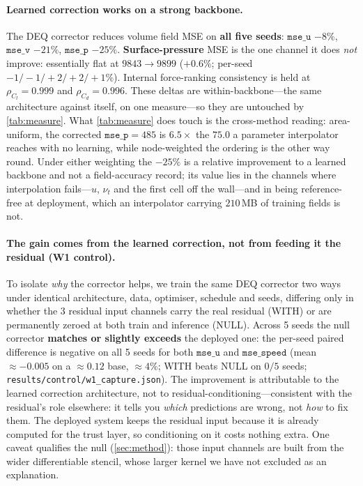 \paragraph{Learned correction works on a strong backbone.} The DEQ corrector reduces
volume field MSE on \textbf{all five seeds}: $\texttt{mse\_u}$ $-8\%$, $\texttt{mse\_v}$
$-21\%$, $\texttt{mse\_p}$ $-25\%$. \textbf{Surface-pressure} MSE is the one channel it
does \emph{not} improve: essentially flat at $9843\rightarrow9899$ ($+0.6\%$; per-seed
$-1/-1/+2/+2/+1\%$). Internal force-ranking consistency is held at $\rho_{C_l}=0.999$ and
$\rho_{C_d}=0.996$. These deltas are within-backbone---the same architecture against
itself, on one measure---so they are untouched by \autoref{tab:measure}. What
\autoref{tab:measure} does touch is the cross-method reading: area-uniform, the corrected
$\texttt{mse\_p}=485$ is $6.5\times$ the $75.0$ a parameter interpolator reaches with no
learning, while node-weighted the ordering is the other way round. Under either weighting
the $-25\%$ is a relative improvement to a learned backbone and not a field-accuracy
record; its value lies in the channels where interpolation fails---$u$, $\nu_t$ and the
first cell off the wall---and in being reference-free at deployment, which an interpolator
carrying $210$\,MB of training fields is not.

\paragraph{The gain comes from the learned correction, not from feeding it the residual
(W1 control).} To isolate \emph{why} the corrector helps, we train the same DEQ corrector
two ways under identical architecture, data, optimiser, schedule and seeds, differing only
in whether the 3 residual input channels carry the real residual (WITH) or are permanently
zeroed at both train and inference (NULL). Across 5 seeds the null corrector
\textbf{matches or slightly exceeds} the deployed one: the per-seed paired difference is
negative on all 5 seeds for both $\texttt{mse\_u}$ and $\texttt{mse\_speed}$ (mean
$\approx -0.005$ on a $\approx 0.12$ base, $\approx 4\%$; WITH beats NULL on $0/5$ seeds;
\texttt{results/control/w1\_capture.json}). The improvement is attributable to the learned
correction architecture, not to residual-conditioning---consistent with the residual's role
elsewhere: it tells you \emph{which} predictions are wrong, not \emph{how} to fix them. The
deployed system keeps the residual input because it is already computed for the trust
layer, so conditioning on it costs nothing extra. One caveat qualifies the null
(\autoref{sec:method}): those input channels are built from the wider differentiable
stencil, whose larger kernel we have not excluded as an explanation.

